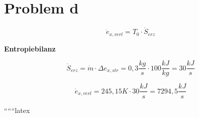 \section*{Problem d}

\[
\dot{e}_{x, verl} = T_0 \cdot \dot{S}_{erz}
\]

\textbf{Entropiebilanz}

\[
\dot{S}_{erz} = \dot{m} \cdot \Delta e_{x, str} = 0,3 \frac{kg}{s} \cdot 100 \frac{kJ}{kg} = 30 \frac{kJ}{s}
\]

\[
\dot{e}_{x, verl} = 245,15 K \cdot 30 \frac{kJ}{s} = 7294,5 \frac{kJ}{s}
\]

``````latex